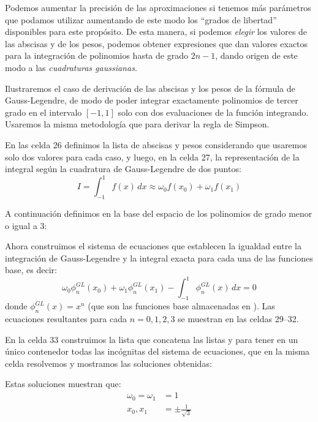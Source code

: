 Podemos aumentar la precisión de las aproximaciones si tenemos más parámetros que podamos utilizar aumentando de este modo los ``grados de libertad'' disponibles para este propósito. De esta manera, si podemos \textit{elegir} los valores de las abscisas y de los pesos, podemos obtener expresiones que dan valores exactos para la integración de polinomios hasta de grado $2n-1$, dando origen de este modo a las \textit{cuadraturas gaussianas}.

Ilustraremos el caso de derivación de las abscisas y los pesos de la fórmula de Gauss-Legendre, de modo de poder integrar exactamente polinomios de tercer grado en el intervalo $[-1, 1]$ solo con dos evaluaciones de la función integrando. Usaremos la misma metodología que para derivar la regla de Simpson.


En las celda 26 definimos la lista de abscisas y pesos considerando que usaremos solo dos valores para cada caso, y luego, en la celda 27, la representación de la integral según la cuadratura de Gauss-Legendre de dos puntos:
\begin{equation}\label{eq:intGL}
 I = \int_{-1}^{1} f(x) \, dx \approx \omega_0 f(x_0) + \omega_1 f(x_1)
\end{equation} 

A continuación definimos en  la base del espacio de los polinomios de grado menor o igual a 3:


Ahora construimos el sistema de ecuaciones que establecen la igualdad entre la integración de Gauss-Legendre y la integral exacta para cada una de las funciones base, es decir:
\[ \omega_0 \phi_n^{GL}(x_0) + \omega_1 \phi_n^{GL}(x_1) - \int_{-1}^{1} \phi_n^{GL}(x) \, dx = 0 \]
donde $\phi_n^{GL}(x) = x^n$ (que son las funciones base almacenadas en ). Las ecuaciones resultantes para cada $n = 0, 1, 2, 3$ se muestran en las celdas 29--32.

En la celda 33 construimos la lista  que concatena las listas  y  para tener en un único contenedor todas las incógnitas del sistema de ecuaciones, que en la misma celda resolvemos y mostramos las soluciones obtenidas:

Estas soluciones muestran que:
\begin{align*}
 \omega_0 = \omega_1 &= 1 \\
  x_0, x_1 &= \pm \frac{1}{\sqrt{3}}
\end{align*}

